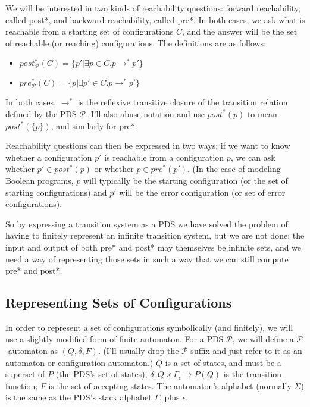 \documentclass{article}
\newcommand{\powerset}[1]{P(#1)}
\begin{document}
We will be interested in two kinds of reachability questions: forward
reachability, called post*, and backward reachability, called pre*. In
both cases, we ask what is reachable from a starting set of
configurations $C$, and the answer will be the set of reachable (or
reaching) configurations. The definitions are as follows:
\begin{itemize}
\item $post^*_{\mathcal{P}}(C) = \{p' | \exists p\in C. p \rightarrow^*
  p'\}$
\item $pre^*_{\mathcal{P}}(C) = \{p | \exists p'\in C. p \rightarrow^*
  p'\}$
\end{itemize}
In both cases, $\rightarrow^*$ is the reflexive transitive closure of
the transition relation defined by the PDS $\mathcal{P}$. I'll also
abuse notation and use $post^*(p)$ to mean $post^*(\{p\})$, and
similarly for pre*.

Reachability questions can then be expressed in two ways: if we want
to know whether a configuration $p'$ is reachable from a configuration
$p$, we can ask whether $p' \in post^*(p)$ or whether $p \in
pre^*(p')$. (In the case of modeling Boolean programs, $p$ will
typically be the starting configuration (or the set of starting
configurations) and $p'$ will be the error configuration (or set of
error configurations).

So by expressing a transition system as a PDS we have solved the
problem of having to finitely represent an infinite transition system,
but we are not done: the input and output of both pre* and post* may
themselves be infinite sets, and we need a way of representing those
sets in such a way that we can still compute pre* and post*.

\subsection{Representing Sets of Configurations}

In order to represent a set of configurations symbolically (and
finitely), we will use a slightly-modified form of finite
automaton. For a PDS $\mathcal{P}$, we will define a
$\mathcal{P}$-automaton as $(Q, \delta, F)$. (I'll usually drop the
$\mathcal{P}$ suffix and just refer to it as an automaton or
configuration automaton.) $Q$ is a set of states, and must be a
superset of $P$ (the PDS's set of states); $\delta: Q \times
\Gamma_\epsilon \rightarrow \powerset{Q}$ is the transition function;
$F$ is the set of accepting states. The automaton's alphabet (normally
$\Sigma$) is the same as the PDS's stack alphabet $\Gamma$, plus
$\epsilon$.
\end{document}
